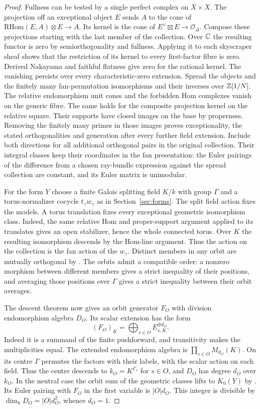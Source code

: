 \begin{proof}
Fullness can be tested by a single perfect complex on $X\times X$. The projection off an exceptional object $E$ sends $A$ to the cone of $\mathrm{RHom}(E,A)\otimes E\to A$. Its kernel is the cone of $E^\vee\boxtimes E\to\mathcal O_\Delta$. Compose these projections starting with the last member of the collection. Over $\mathbb C$ the resulting functor is zero by semiorthogonality and fullness. Applying it to each skyscraper sheaf shows that the restriction of its kernel to every first-factor fibre is zero. Derived Nakayama and faithful flatness give zero for the rational kernel. The vanishing persists over every characteristic-zero extension. Spread the objects and the finitely many fan-permutation isomorphisms and their inverses over $\mathbb Z[1/N]$. The relative endomorphism unit cones and the forbidden Hom complexes vanish on the generic fibre. The same holds for the composite projection kernel on the relative square. Their supports have closed images on the base by properness. Removing the finitely many primes in those images proves exceptionality, the stated orthogonalities and generation after every further field extension. Include both directions for all additional orthogonal pairs in the original collection. Their integral classes keep their coordinates in the fan presentation: the Euler pairings of the difference from a chosen ray-bundle expression against the spread collection are constant, and its Euler matrix is unimodular.

For the form $Y$ choose a finite Galois splitting field $K/k$ with group $\Gamma$ and a torus-normalizer cocycle $t_\gamma w_\gamma$ as in Section~\ref{sec:forms}. The split field action fixes the models. A torus translation fixes every exceptional geometric isomorphism class. Indeed, the same relative Hom and proper-support argument applied to its translates gives an open stabilizer, hence the whole connected torus. Over $K$ the resulting isomorphism descends by the Hom-line argument. Thus the action on the collection is the fan action of the $w_\gamma$. Distinct members in any orbit are mutually orthogonal by \cite[Lemma~2.12]{BDM}. The orbits admit a compatible order: a nonzero morphism between different members gives a strict inequality of their positions, and averaging those positions over $\Gamma$ gives a strict inequality between their orbit averages.

The descent theorem \cite[Theorem~2.17]{BDM} now gives an orbit generator $F_O$ with division endomorphism algebra $D_O$. Its scalar extension has the form
\[
                   (F_O)_K=\bigoplus_{s\in O} E_{s,K}^{\oplus d_O}.
\]
Indeed it is a summand of the finite pushforward, and transitivity makes the multiplicities equal. The extended endomorphism algebra is $\prod_{s\in O}M_{d_O}(K)$. On its centre $\Gamma$ permutes the factors with their labels, with the scalar action on each field. Thus the centre descends to $k_O=K^{\Gamma_s}$ for $s\in O$, and $D_O$ has degree $d_O$ over $k_O$. In the neutral case the orbit sum of the geometric classes lifts to $K_0(Y)$ by \cite[Corollary~4.4(3) and Proposition~5.6]{MP}. Its Euler pairing with $F_O$ in the first variable is $|O|d_O$. This integer is divisible by $\dim_k D_O=|O|d_O^2$, whence $d_O=1$.
\end{proof}


